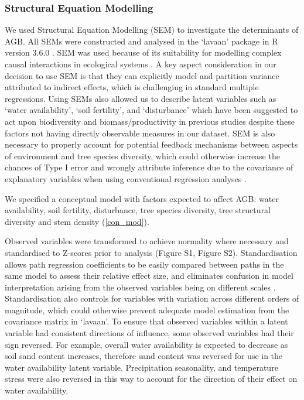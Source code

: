 \documentclass[12pt,a4paper]{article}
\begin{document}
\subsubsection{Structural Equation Modelling}

We used Structural Equation Modelling (SEM) to investigate the determinants of AGB. All SEMs were constructed and analysed in the `lavaan' package \citep{lavaan} in R version 3.6.0 \citep{R2019}. SEM was used because of its suitability for modelling complex causal interactions in ecological systems \citep{Lee2007}. A key aspect consideration in our decision to use SEM is that they can explicitly model and partition variance attributed to indirect effects, which is challenging in standard multiple regressions. Using SEMs also allowed us to describe latent variables such as `water availability', `soil fertility', and `disturbance' which have been suggested to act upon biodiversity and biomass/productivity in previous studies despite these factors not having directly observable measures in our dataset. SEM is also necessary to properly account for potential feedback mechanisms between aspects of environment and tree species diversity, which could otherwise increase the chances of Type I error and wrongly attribute inference due to the covariance of explanatory variables when using conventional regression analyses \citep{Nachtigall2003}.

We specified a conceptual model with factors expected to affect AGB: water availability, soil fertility, disturbance, tree species diversity, tree structural diversity and stem density (\autoref{con_mod}). 

Observed variables were transformed to achieve normality where necessary and standardised to Z-scores prior to analysis (Figure S1, Figure S2). Standardisation allows path regression coefficients to be easily compared between paths in the same model to assess their relative effect size, and eliminates confusion in model interpretation arising from the observed variables being on different scales \citep{Beaujean2014}. Standardisation also controls for variables with variation across different orders of magnitude, which could otherwise prevent adequate model estimation from the covariance matrix in `lavaan'. To ensure that observed variables within a latent variable had consistent directions of influence, some observed variables had their sign reversed. For example, overall water availability is expected to decrease as soil sand content increases, therefore sand content was reversed for use in the water availability latent variable. Precipitation seasonality, and temperature stress were also reversed in this way to account for the direction of their effect on water availability. 
\end{document}
